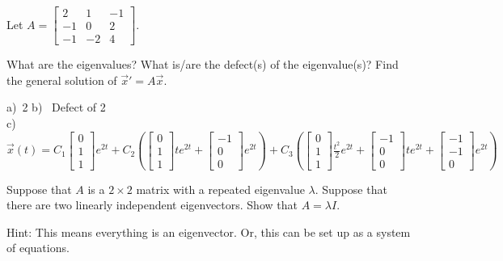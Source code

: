 \begin{exercise}
Let
$A = \left[ \begin{smallmatrix}
2 & 1 & -1 \\
-1 & 0 & 2 \\
-1 & -2 & 4
\end{smallmatrix} \right]$.
\begin{tasks}
\task What are the eigenvalues?
\task What is/are the defect(s) of the eigenvalue(s)?
\task Find the general solution of ${\vec{x}}' = A \vec{x}$.
\end{tasks}
\end{exercise}
\comboSol{%
}
{%
a)~2 \quad b)~ Defect of 2 \\ c)~ $\vec{x}(t) = C_1 \left[\begin{smallmatrix} 0 \\ 1 \\ 1 \end{smallmatrix}\right]e^{2t} + C_2\left(\left[\begin{smallmatrix} 0 \\1 \\ 1 \end{smallmatrix}\right]te^{2t} + \left[\begin{smallmatrix} -1 \\ 0 \\ 0 \end{smallmatrix}\right]e^{2t}\right) + C_3\left(\left[\begin{smallmatrix} 0 \\1 \\ 1 \end{smallmatrix}\right]\frac{t^2}{2}e^{2t} + \left[\begin{smallmatrix} -1 \\ 0 \\ 0 \end{smallmatrix}\right]te^{2t} + \left[\begin{smallmatrix} -1 \\-1 \\0 \end{smallmatrix}\right]e^{2t}\right)$
}

\begin{exercise}
Suppose that $A$ is a $2 \times 2$ matrix with a repeated eigenvalue
$\lambda$.
Suppose that there are two linearly independent eigenvectors.  Show that
$A = \lambda I$.
\end{exercise}
\comboSol{%
}
{%
Hint: This means everything is an eigenvector. Or, this can be set up as a system of equations.
}

